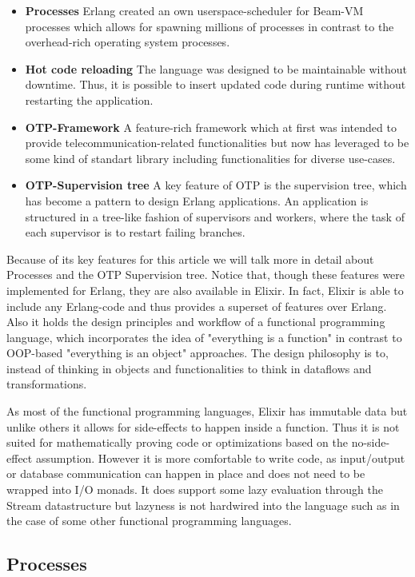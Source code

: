 \documentclass[]{paper}
\begin{document}
\begin{itemize}
	\item \textbf{Processes} Erlang created an own userspace-scheduler for Beam-VM processes which allows for spawning millions of processes in contrast to the overhead-rich operating system processes.
	\item \textbf{Hot code reloading} The language was designed to be maintainable without downtime. Thus, it is possible to insert updated code during runtime without restarting the application.
	\item \textbf{OTP-Framework} A feature-rich framework which at first was intended to provide telecommunication-related functionalities but now has leveraged to be some kind of standart library including functionalities for diverse use-cases.
	\item \textbf{OTP-Supervision tree} A key feature of OTP is the supervision tree, which has become a pattern to design Erlang applications. An application is structured in a tree-like fashion of supervisors and workers, where the task of each supervisor is to restart failing branches.
\end{itemize}

Because of its key features for this article we will talk more in detail about Processes and the OTP Supervision tree. Notice that, though these features were implemented for Erlang, they are also available in Elixir. In fact, Elixir is able to include any Erlang-code and thus provides a superset of features over Erlang. Also it holds the design principles and workflow of a functional programming language, which incorporates the idea of "everything is a function" in contrast to OOP-based "everything is an object" approaches. The design philosophy is to, instead of thinking in objects and functionalities to think in dataflows and transformations.

As most of the functional programming languages, Elixir has immutable data but unlike others it allows for side-effects to happen inside a function. Thus it is not suited for mathematically proving code or optimizations based on the no-side-effect assumption. However it is more comfortable to write code, as input/output or database communication can happen in place and does not need to be wrapped into I/O monads. It does support some lazy evaluation through the Stream datastructure but lazyness is not hardwired into the language such as in the case of some other functional programming languages.

\subsection{Processes}
\end{document}
